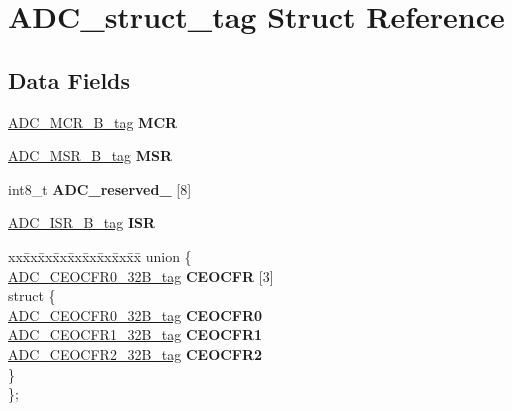 \hypertarget{structADC__struct__tag}{}\section{A\+D\+C\+\_\+struct\+\_\+tag Struct Reference}
\label{structADC__struct__tag}
\subsection*{Data Fields}
\begin{DoxyCompactItemize}
\item 
\mbox{\label{structADC__struct__tag_aefe84c34e20479e00f2565bc253cb1e6}} 
\mbox{\hyperlink{unionADC__MCR__32B__tag}{A\+D\+C\+\_\+\+M\+C\+R\+\_\+B\+\_\+tag}} {\bfseries M\+CR}
\item 
\mbox{\label{structADC__struct__tag_a11bd3a4432ab07a0c4d445910ceb4f16}} 
\mbox{\hyperlink{unionADC__MSR__32B__tag}{A\+D\+C\+\_\+\+M\+S\+R\+\_\+B\+\_\+tag}} {\bfseries M\+SR}
\item 
\mbox{\label{structADC__struct__tag_a67b3b4171c9e91980ed84c25b9e9082f}} 
int8\+\_\+t {\bfseries A\+D\+C\+\_\+reserved\+\_} \mbox{[}8\mbox{]}
\item 
\mbox{\label{structADC__struct__tag_a17a40063f0b737027414b740bc142889}} 
\mbox{\hyperlink{unionADC__ISR__32B__tag}{A\+D\+C\+\_\+\+I\+S\+R\+\_\+B\+\_\+tag}} {\bfseries I\+SR}
\item 
\mbox{\label{structADC__struct__tag_ab7fc93882ddef2fd8fb6d634776d1c1e}} 
\begin{tabbing}
xx\=xx\=xx\=xx\=xx\=xx\=xx\=xx\=xx\=\kill
union \{\\
\>\mbox{\hyperlink{unionADC__CEOCFR0__32B__tag}{ADC\_CEOCFR0\_32B\_tag}} {\bfseries CEOCFR} \mbox{[}3\mbox{]}\\
\mbox{\label{unionADC__struct__tag_1_1_0D1810_a35562608e5b4151580d67b2a71f16b80}} 
\>struct \{\\
\>\>\mbox{\hyperlink{unionADC__CEOCFR0__32B__tag}{ADC\_CEOCFR0\_32B\_tag}} {\bfseries CEOCFR0}\\
\>\>\mbox{\hyperlink{unionADC__CEOCFR1__32B__tag}{ADC\_CEOCFR1\_32B\_tag}} {\bfseries CEOCFR1}\\
\>\>\mbox{\hyperlink{unionADC__CEOCFR2__32B__tag}{ADC\_CEOCFR2\_32B\_tag}} {\bfseries CEOCFR2}\\
\>\} \\
\}; \\


\end{tabbing}
\end{DoxyCompactItemize}
